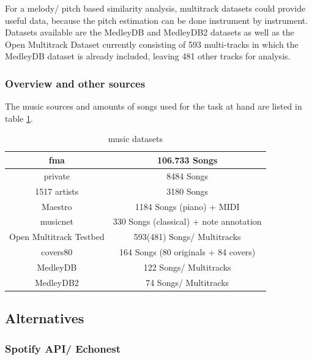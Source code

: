 For a melody/ pitch based similarity analysis, multitrack datasets could provide useful data, because the pitch estimation can be done instrument by instrument. 
Datasets available are the MedleyDB \cite{medleydb1} and MedleyDB2 \cite{medleydb2} datasets as well as the Open Multitrack Dataset \cite{openmult1} currently consisting of 593 multi-tracks in which the MedleyDB dataset is already included, leaving 481 other tracks for analysis.

\subsubsection{Overview and other sources}

The music sources and amounts of songs used for the task at hand are listed in table \ref{table_dsets}.

\begin{table}[h]
	\begin{center}
		\begin{tabular}{|c||c|}
			\hline
			fma & 106.733 Songs\\
			\hline
			private & 8484 Songs\\
			\hline
			1517 artists & 3180 Songs\\
			\hline
			Maestro & 1184 Songs (piano) + MIDI\\
			\hline
			musicnet & 330 Songs (classical) + note annotation\\
			\hline
			Open Multitrack Testbed & 593(481) Songs/ Multitracks\\
			\hline
			covers80 & 164 Songs (80 originals + 84 covers)\\
			\hline
			MedleyDB &  122 Songs/ Multitracks\\
			\hline
			MedleyDB2 &  74 Songs/ Multitracks\\
			\hline
		\end{tabular}
	\end{center}
	\caption{music datasets}
	\label{table_dsets}
\end{table}

\subsection{Alternatives}

\subsubsection{Spotify API/ Echonest}\label{spotipy}

